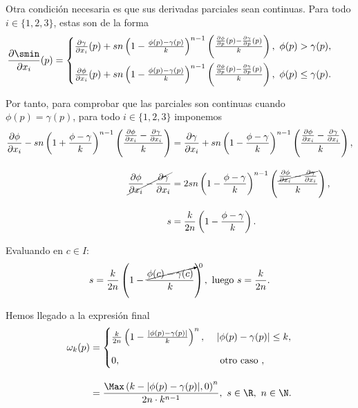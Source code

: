Otra condición necesaria es que sus derivadas parciales sean continuas. Para todo $i\in \{1,2,3\}$, estas son de la forma
\begin{align*}
    \frac{\partial \smin}{\partial x_i}(p) &= \begin{cases}
        \frac{\partial \gamma}{\partial x_i}(p)+ sn\left(1-\frac{\phi(p)-\gamma(p)}{k}\right)^{n-1}\left(\frac{ \frac{\partial \phi}{\partial p}(p)-\frac{\partial \gamma}{\partial p}(p)}{k}\right),\ \phi(p)>\gamma(p), \\[10pt] 
        \frac{\partial \phi}{\partial x_i}(p)+ sn\left(1-\frac{\phi(p)-\gamma(p)}{k}\right)^{n-1}\left(\frac{ \frac{\partial \phi}{\partial p}(p)-\frac{\partial \gamma}{\partial p}(p)}{k}\right),\ \phi(p)\le\gamma(p).
    \end{cases}
\end{align*}

Por tanto, para comprobar que las parciales son continuas cuando $\phi(p) = \gamma(p)$, para todo $i\in \{1,2,3\}$ imponemos 
\begin{align*}
     \frac{\partial \phi}{\partial x_i} - sn\left(1+\frac{\phi-\gamma}{k}\right)^{n-1}\left(\frac{\frac{\partial \phi}{\partial x_i}-\frac{\partial \gamma}{\partial x_i}}{k}\right) &= \frac{\partial \gamma}{\partial x_i} + sn\left(1-\frac{\phi-\gamma}{k}\right)^{n-1}\left(\frac{\frac{\partial \phi}{\partial x_i}-\frac{\partial \gamma}{\partial x_i}}{k}\right),\\[10pt]
     \cancel{\frac{\partial \phi}{\partial x_i} - \frac{\partial \gamma}{\partial x_i}} &= 2sn\left(1-\frac{\phi-\gamma}{k}\right)^{n-1}\left(\frac{ \cancel{\frac{\partial \phi}{\partial x_i}-\frac{\partial \gamma}{\partial x_i}}}{k}\right),\\[10pt]
     s &= \frac{k}{2n}\left(1-\frac{\phi-\gamma}{k}\right).
\end{align*}

Evaluando en $c\in I$:
\begin{align*}
    s = \frac{k}{2n}\left(1-\frac{\cancelto{0}{\phi(c)-\gamma(c)}}{k}\right), \text{ luego } s = \frac{k}{2n}.
\end{align*}
    
Hemos llegado a la expresión final
\begin{align}
    \label{eq:correccion}
    \omega_k(p) &= \begin{cases}
        \frac{k}{2n}\left( 1-\frac{|\phi(p)-\gamma(p)|}{k} \right)^n,\ &|\phi(p)-\gamma(p)|\le k,\\[10pt]
        0,\ &\text{ otro caso },
    \end{cases}\\[10pt] &= \frac{\Max\left( k - |\phi(p) - \gamma(p)|, 0\right)^n}{2n\cdot k^{n-1}}  ,\ s\in\R,\ n\in\N. 
\end{align}

